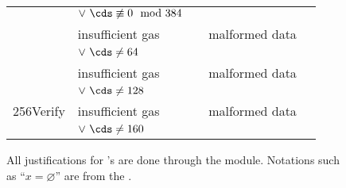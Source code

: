 \begin{figure}[!h]
\begin{tabular}{|l||l|c|l|c|}
                                                  & $\vee~\cds \not \equiv 0 \mod 384$             &                           &                                                                   &                                                  \\ \cline{1-4}
		\instBlsMapFpToGOne{}             & insufficient gas                               & \multirow{2}{*}{\toOob}   & malformed data                                                    &                                                  \\
                                                  & $\vee~\cds \neq  64$                           &                           &                                                                   &                                                  \\ \cline{1-4}
		\instBlsMapFpTwoToGTwo{}          & insufficient gas                               & \multirow{2}{*}{\toOob}   & malformed data                                                    &                                                  \\
                                                  & $\vee~\cds \neq 128$                           &                           &                                                                   &                                                  \\ \hline
	    \instP256Verify{}                 & insufficient gas                               & \multirow{2}{*}{\toOob}   & malformed data                                                    & \multirow{2}{*}{\text{\cite{EIP-7951}, Osaka}}  \\
												  & $\vee~\cds \neq 160$                           &                           &                                                                   &                                                  \\ \hline \hline
	\end{tabular}
	\label{hub: instruction handling: call: precompiles: table classifying failures known to the HUB vs. to RAM}
	\caption{All justifications for \scenPrcFailureKnownToHub{}'s are done through the \oobMod{} module. Notations such as ``$x = \varnothing$'' are from the \cite{EYP-London}.}
\end{figure}

